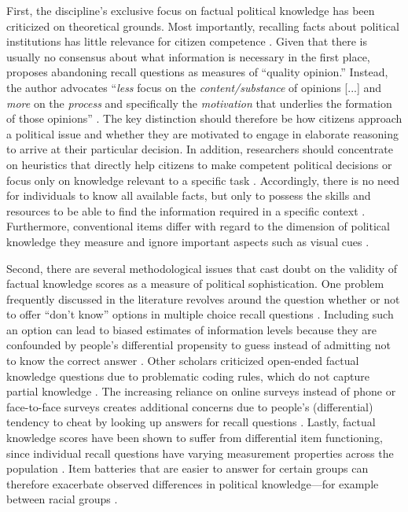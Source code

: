 First, the discipline's exclusive focus on factual political knowledge has been criticized on theoretical grounds. Most importantly, recalling facts about political institutions  has little relevance for citizen competence \citep{lupia2006elitism,cramer2017fact}. Given that there is usually no consensus about what information is necessary in the first place, \citet{druckman2014pathologies} proposes abandoning recall questions as measures of ``quality opinion.'' Instead, the author advocates ``\textit{less} focus on the \textit{content/substance} of opinions [...] and \textit{more} on the \textit{process} and specifically the \textit{motivation} that underlies the formation of those opinions'' \citeyearpar[478, emphasis in the original]{druckman2014pathologies}. The key distinction should therefore be how citizens approach a political issue and whether they are motivated to engage in elaborate reasoning to arrive at their particular decision. In addition, researchers should concentrate on heuristics that directly help citizens to make competent political decisions or focus only on knowledge relevant to a specific task \citep[see also][]{lupia1994shortcuts}. Accordingly, there is no need for individuals to know all available facts, but only to possess the skills and resources to be able to find the information required in a specific context \citep{prior2008money}. Furthermore, conventional items differ with regard to the dimension of political knowledge they measure \citep{barabas2014question} and ignore important aspects such as visual cues \citep{prior2014visual}.

Second, there are several methodological issues that cast doubt on the validity of factual knowledge scores as a measure of political sophistication. One problem frequently discussed in the literature revolves around the question whether or not to offer ``don't know'' options in multiple choice recall questions \citep{mondak2000reconsidering,mondak2001asked,miller2008experimenting}. Including such an option can lead to biased estimates of information levels because they are confounded by people's differential propensity to guess instead of admitting not to know the correct answer \citep[but see][]{luskin2011don}. Other scholars criticized open-ended factual knowledge questions due to problematic coding rules, which do not capture partial knowledge \citep{krosnick2008problems,gibson2009knowing,debell2013harder}. The increasing reliance on online surveys instead of phone or face-to-face surveys creates additional concerns due to people's (differential) tendency to cheat by looking up answers for recall questions \citep{clifford2016cheating,hohne2021looking,style2021does}. Lastly, factual knowledge scores have been shown to suffer from differential item functioning, since individual recall questions have varying measurement properties across the population \citep{pietryka2013analysis}. Item batteries that are easier to answer for certain groups can therefore exacerbate observed differences in political knowledge---for example between racial groups \citep{abrajano2014reexamining}.


